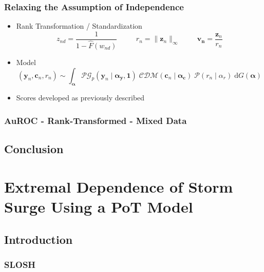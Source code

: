 \documentclass[aspectratio=169,10pt]{beamer}
\begin{document}
\begin{frame}
    \frametitle{Relaxing the Assumption of Independence}
    \begin{itemize}
        \item Rank Transformation / Standardization
        \[
            z_{nd} = \frac{1}{1 - \hat{F}(w_{nd})}\
            \hspace{1cm}r_n = \lVert \bm{z}_n\rVert_{\infty}
            \hspace{1cm}\bm{v_{n}} = \frac{\bm{z}_n}{r_n}
        \]
        \item Model
        \[
        (\bm{y}_n,\bm{c}_n,r_n) \sim \int_{\bm{\alpha}}
            \mathcal{PG}_p(\bm{y}_n\mid\bm{\alpha}_{\bm{y}}, \bm{1})\;
            \mathcal{CDM}(\bm{c}_n\mid\bm{\alpha}_{\bm{c}})\;
            \mathcal{P}(r_n\mid\alpha_r)\;
            \text{d}G(\bm{\alpha})
        \]
        \item Scores developed as previously described        
    \end{itemize}
\end{frame} %

\begin{frame}
    \frametitle{AuROC - Rank-Transformed - Mixed Data}
    \begin{table}
        \centering
        
    \end{table}
\end{frame} %

\subsection{Conclusion}

\section[Storm Surge]{Extremal Dependence of Storm Surge Using a PoT Model}
\subsection{Introduction}

\subsubsection{SLOSH}
\end{document}
